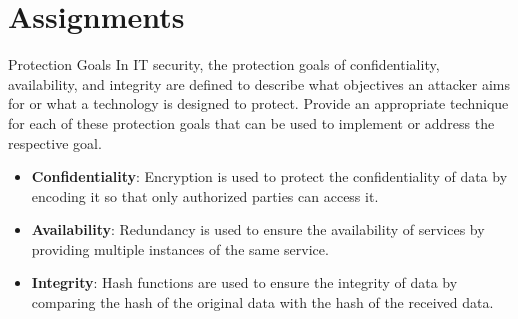 \documentclass{article}
\author{Leopold Lemmermann}
\begin{document}
\createtitle

\section{Assignments}
\begin{exercise}{Protection Goals}
  In IT security, the protection goals of confidentiality, availability, and integrity are defined to describe what objectives an attacker aims for or what a technology is designed to protect. Provide an appropriate technique for each of these protection goals that can be used to implement or address the respective goal.

  \begin{solution}
    \begin{itemize}
      \item \textbf{Confidentiality}: Encryption is used to protect the confidentiality of data by encoding it so that only authorized parties can access it.
      \item \textbf{Availability}: Redundancy is used to ensure the availability of services by providing multiple instances of the same service.
      \item \textbf{Integrity}: Hash functions are used to ensure the integrity of data by comparing the hash of the original data with the hash of the received data.
    \end{itemize}
  \end{solution}
\end{exercise}
\end{document}
